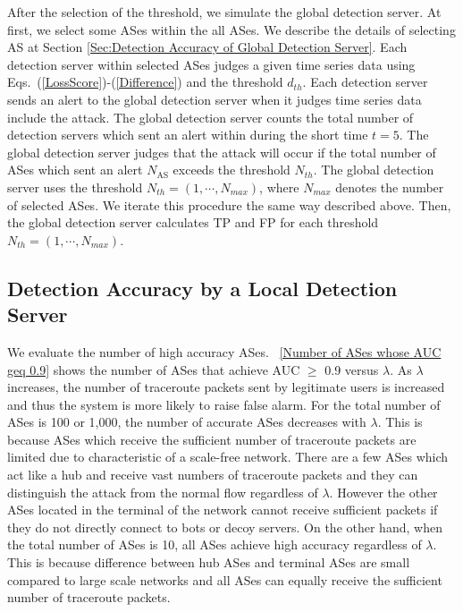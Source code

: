 \documentclass[conference]{IEEEtran}
\begin{document}
    After the selection of the threshold, we simulate the global detection server.
    At first, we select some ASes within the all ASes.
    We describe the details of selecting AS at Section \ref{Sec:Detection Accuracy of Global Detection Server}.
    Each detection server within selected ASes judges a given time series data using Eqs.~(\ref{LossScore})-(\ref{Difference}) and the threshold $d_{th}$.
    Each detection server sends an alert to the global detection server when it judges  time series data include the attack.
    The global detection server counts the total number of detection servers which sent an alert within during the short time $t=5$.
    The global detection server judges that the attack will occur if the total number of ASes which sent an alert $N_{\text{AS}}$ exceeds the threshold $N_{th}$.
    The global detection server uses the threshold $N_{th} = (1, \cdots, N_{max})$, where $N_{max}$ denotes the number of selected ASes.
    We iterate this procedure the same way described above.
    Then, the global detection server calculates TP and FP for each threshold $N_{th} = (1, \cdots, N_{max})$.
      
  \subsection{Detection Accuracy by a Local Detection Server}\label{Sec:Detection Accuracy by Local Detection Server}
    We evaluate the number of high accuracy ASes.
    \figurename~\ref{Number of ASes whose AUC geq 0.9} shows the number of ASes that achieve AUC $\geq$ 0.9 versus $\lambda$.
    As $\lambda$ increases, the number of traceroute packets sent by legitimate users is increased and thus the system is more likely to raise false alarm.
    For the total number of ASes is 100 or 1,000, the number of accurate ASes decreases with $\lambda$.
    This is because ASes which receive the sufficient number of traceroute packets are limited due to characteristic of a scale-free network.
    There are a few ASes which act like a hub and receive vast numbers of traceroute packets and they can distinguish the attack from the normal flow regardless of $\lambda$.
    However the other ASes located in the terminal of the network cannot receive sufficient packets if they do not directly connect to bots or decoy servers.
    On the other hand, when the total number of ASes is 10, all ASes achieve high accuracy regardless of $\lambda$.
    This is because difference between hub ASes and terminal ASes are small compared to large scale networks and all ASes can equally receive the sufficient number of traceroute packets.
      
\end{document}
